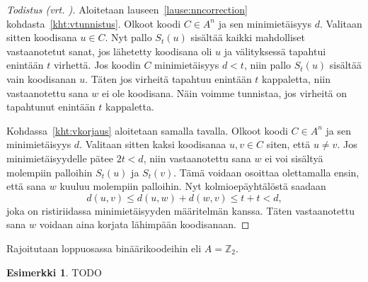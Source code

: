\documentclass[a4paper,12pt,leqno,oneside]{report} %
\theoremstyle{plain}
\theoremstyle{definition}
\newtheorem{esimerkki}{Esimerkki}[chapter]
\theoremstyle{remark}
\numberwithin{equation}{chapter}
\newcommand*{\Zset}{\mathbb{Z}}  %
\begin{document}
    \begin{proof}[Todistus \upshape(vrt. {\cite[s.~494]{PA}})]\label{tod:nncorrection}
        Aloitetaan lauseen~\ref{lause:nncorrection} kohdasta~\ref{kht:vtunnistus}. Olkoot koodi $C \in A^n$ ja sen minimietäisyys $d$. Valitaan sitten koodisana $u \in C$. Nyt pallo $S_t(u)$ sisältää kaikki mahdolliset vastaanotetut sanat, jos lähetetty koodisana oli $u$ ja välityksessä tapahtui enintään $t$ virhettä. Jos koodin $C$ minimietäisyys $d < t$, niin pallo $S_t(u)$ sisältää vain koodisanan $u$. Täten jos virheitä tapahtuu enintään $t$ kappaletta, niin vastaanotettu sana $w$ ei ole koodisana. Näin voimme tunnistaa, jos virheitä on tapahtunut enintään $t$ kappaletta.

        Kohdassa~\ref{kht:vkorjaus} aloitetaan samalla tavalla. Olkoot koodi $C \in A^n$ ja sen minimietäisyys $d$. Valitaan sitten kaksi koodisanaa $u, v \in C$ siten, että $u \neq v$. Jos minimietäisyydelle pätee $2t < d$, niin vastaanotettu sana $w$ ei voi sisältyä molempiin palloihin $S_t(u)$ ja $S_t(v)$. Tämä voidaan osoittaa olettamalla ensin, että sana $w$ kuuluu molempiin palloihin. Nyt kolmioepäyhtälöstä saadaan
        \[
            d(u,v) \le d(u,w) + d(w, v) \le t + t < d,
        \]
        joka on ristiriidassa minimietäisyyden määritelmän kanssa. Täten vastaanotettu sana $w$ voidaan aina korjata lähimpään koodisanaan.
    \end{proof}

    Rajoitutaan loppuosassa binäärikoodeihin eli $A = \Zset_2$.
    \begin{esimerkki}
        TODO
    \end{esimerkki}
\end{document}
